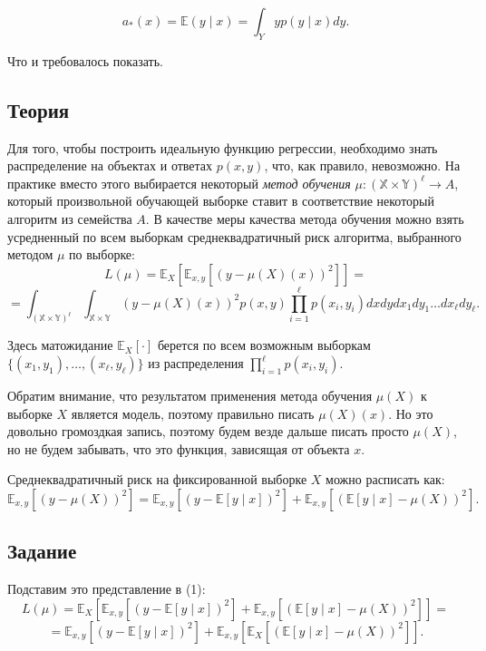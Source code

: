 \[
    a_*(x) = \mathbb{E}(y \mid x) = \int_Y y p(y \mid x) dy.
\]

Что и требовалось показать.


\subsection*{Теория}

Для того, чтобы построить идеальную функцию регрессии, необходимо знать распределение на объектах и ответах $p(x, y)$, что, как правило, невозможно. На практике вместо этого выбирается некоторый \emph{метод обучения} $\mu : (\mathbb{X} \times \mathbb{Y})^\ell \to A$, который произвольной обучающей выборке ставит в соответствие некоторый алгоритм из семейства $A$. В качестве меры качества метода обучения можно взять усредненный по всем выборкам среднеквадратичный риск алгоритма, выбранного методом $\mu$ по выборке:
\newpage
\[
    L(\mu) = \mathbb{E}_X \left[ \mathbb{E}_{x, y} \left[ \left( y - \mu(X)(x) \right)^2 \right] \right] = \tag{1}
\]
\[
    =\int_{(\mathbb{X} \times \mathbb{Y})^\ell} \int_{\mathbb{X} \times \mathbb{Y}} (y - \mu(X)(x))^2
    p(x, y) \prod_{i=1}^\ell p(x_i, y_i) dx dy dx_1 dy_1 \ldots dx_\ell dy_\ell.
\]

Здесь матожидание $\mathbb{E}_X[\cdot]$ берется по всем возможным выборкам $\{(x_1, y_1), \ldots, (x_\ell, y_\ell)\}$ из распределения $\prod_{i=1}^\ell p(x_i, y_i)$.

Обратим внимание, что результатом применения метода обучения $\mu(X)$ к выборке $X$ является модель, поэтому правильно писать $\mu(X)(x)$. Но это довольно громоздкая запись, поэтому будем везде дальше писать просто $\mu(X)$, но не будем забывать, что это функция, зависящая от объекта $x$.

Среднеквадратичный риск на фиксированной выборке $X$ можно расписать как:
\[
    \mathbb{E}_{x, y} \left[ \left( y - \mu(X) \right)^2 \right] =
    \mathbb{E}_{x, y} \left[ \left( y - \mathbb{E}[y \mid x] \right)^2 \right] +
    \mathbb{E}_{x, y} \left[ \left( \mathbb{E}[y \mid x] - \mu(X) \right)^2 \right].
\]

\subsection*{Задание}

Подставим это представление в (1):
\[
    L(\mu) = \mathbb{E}_X \left[ \mathbb{E}_{x,y} \left[ \left( y - \mathbb{E}[y \mid x] \right)^2 \right]
        + \mathbb{E}_{x,y} \left[ \left( \mathbb{E}[y \mid x] - \mu(X) \right)^2 \right] \right] =
\]
\[
    = \mathbb{E}_{x,y} \left[ \left( y - \mathbb{E}[y \mid x] \right)^2 \right]
    + \mathbb{E}_{x,y} \left[ \mathbb{E}_X \left[ \left( \mathbb{E}[y \mid x] - \mu(X) \right)^2 \right] \right]. \tag{2}
\]

